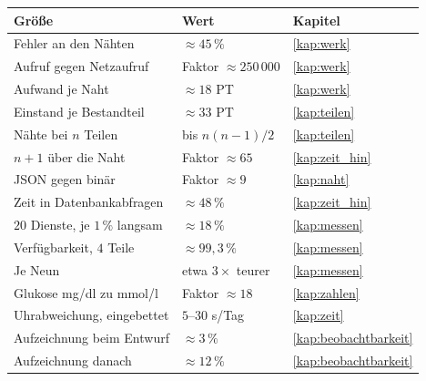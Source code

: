 \begin{merksatz}
\begin{center}
{\small
\renewcommand{\arraystretch}{1.42}
\begin{tabular}{@{}P{4.0cm}P{2.2cm}P{2.4cm}@{}}
\toprule
\textbf{Größe} & \textbf{Wert} & \textbf{Kapitel}\\
\midrule
Fehler an den Nähten & $\approx45\,\%$ & \ref{kap:werk}\\
Aufruf gegen Netzaufruf & Faktor $\approx250\,000$ & \ref{kap:werk}\\
Aufwand je Naht & $\approx18$ PT & \ref{kap:werk}\\
Einstand je Bestandteil & $\approx33$ PT & \ref{kap:teilen}\\
Nähte bei $n$ Teilen & bis $n(n{-}1)/2$ & \ref{kap:teilen}\\
$n{+}1$ über die Naht & Faktor $\approx65$ & \ref{kap:zeit_hin}\\
JSON gegen binär & Faktor $\approx9$ & \ref{kap:naht}\\
Zeit in Datenbankabfragen & $\approx48\,\%$ & \ref{kap:zeit_hin}\\
$20$ Dienste, je $1\,\%$ langsam & $\approx18\,\%$ & \ref{kap:messen}\\
Verfügbarkeit, $4$ Teile & $\approx99{,}3\,\%$ & \ref{kap:messen}\\
Je Neun & etwa $3\times$ teurer & \ref{kap:messen}\\
Glukose mg/dl zu mmol/l & Faktor $\approx18$ & \ref{kap:zahlen}\\
Uhrabweichung, eingebettet & $5$--$30$ s/Tag & \ref{kap:zeit}\\
Aufzeichnung beim Entwurf & $\approx3\,\%$ & \ref{kap:beobachtbarkeit}\\
Aufzeichnung danach & $\approx12\,\%$ & \ref{kap:beobachtbarkeit}\\
\bottomrule
\end{tabular}}
\end{center}

\begin{center}
\begin{minipage}{0.88\textwidth}
\end{minipage}
\end{center}
\end{merksatz}

